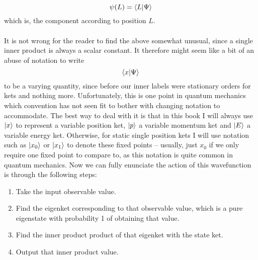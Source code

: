 $$
\psi(L)=\langle L|\Psi\rangle
$$
which is, the component according to position $L$. 
\\\\
It is not wrong for the reader to find the above somewhat unusual, since a single inner product is always a scalar constant. It therefore might seem like a bit of an abuse of notation to write
$$
\langle x|\Psi\rangle
$$
to be a varying quantity, since before our inner labels were stationary orders for kets and nothing more. Unfortunately, this is one point in quantum mechanics which convention has not seen fit to bother with changing notation to accommodate. The best way to deal with it is that in this book I will always use $|x\rangle$ to represent a variable position ket, $|p\rangle$ a variable momentum ket and $|E\rangle$ a variable energy ket. Otherwise, for static single position kets I will use notation such as $|x_{0}\rangle$ or $|x_{1}\rangle$ to denote these fixed points -- usually, just $x_{0}$ if we only require one fixed point to compare to, as this notation is quite common in quantum mechanics. Now we can fully enunciate the action of this wavefunction is through the following steps:
\begin{enumerate}
    \item Take the input observable value.
    \item Find the eigenket corresponding to that observable value, which is a pure eigenstate with probability 1 of obtaining that value.
    \item Find the inner product product of that eigenket with the state ket.
    \item Output that inner product value.
\end{enumerate}

